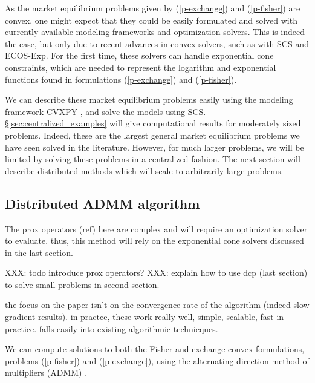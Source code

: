 \documentclass[12pt]{article}
\begin{document}
As the market equilibrium problems given by (\ref{p-exchange}) and
(\ref{p-fisher}) are convex, one might expect that they could be easily
formulated and solved with currently available modeling frameworks and
optimization solvers. This is indeed the case, but only due to recent advances
in convex solvers, such as with SCS \cite{scs} and ECOS-Exp. %
For the first time, these solvers can handle exponential cone constraints,
which are needed to represent the logarithm and exponential functions found in
formulations (\ref{p-exchange}) and (\ref{p-fisher}).

We can describe these market equilibrium problems easily using the modeling
framework CVXPY \cite{cvxpy}, and solve the models using SCS.
\S\ref{sec:centralized_examples} will give computational results for moderately
sized problems. Indeed, these are the largest general market equilibrium
problems we have seen solved in the literature. However, for much larger
problems, we will be limited by solving these problems in a centralized
fashion. The next section will describe distributed methods which will scale to
arbitrarily large problems.


\subsection{Distributed ADMM algorithm}
\label{sec:distributed}

The prox operators (ref) here are complex and will require an optimization
solver to evaluate. thus, this method will rely on the exponential cone
solvers discussed in the last section.

XXX: todo introduce prox operators?
XXX: explain how to use dcp (last section) to solve small problems in second section.

the focus on the paper isn't on the convergence rate of the algorithm (indeed
slow gradient results). in practce, these work really well, simple, scalable,
fast in practice. falls easily into existing algorithmic technicques.


We can compute solutions to both the Fisher and
exchange convex formulations, problems (\ref{p-fisher}) and (\ref{p-exchange}),
using the alternating direction method of multipliers (ADMM)
\cite{boyd2011distributed, parikh2013proximal}.
\end{document}
